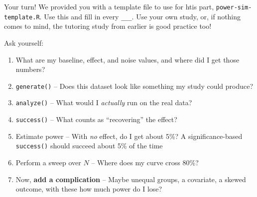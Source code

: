 \documentclass[
  ignorenonframetext,
  aspectratio=169,
]{beamer}
\providecommand{\tightlist}{%
  \setlength{\itemsep}{0pt}\setlength{\parskip}{0pt}}\usepackage{longtable,booktabs,array}
\begin{document}
\begin{frame}{Your turn!}
\label{your-turn}
We provided you with a template file to use for htis part,
\texttt{power-sim-template.R}. Use this and fill in every
\texttt{\_\_\_}. Use your own study, or, if nothing comes to mind, the
tutoring study from earlier is good practice too!

Ask yourself:

\begin{enumerate}
\tightlist
\item
  What are my baseline, effect, and noise values, and where did I get
  those numbers?
\item
  \texttt{generate()} -- Does this dataset look like something my study
  could produce?
\item
  \texttt{analyze()} -- What would I \textit{actually} run on the real
  data?
\item
  \texttt{success()} -- What counts as ``recovering'' the effect?
\item
  Estimate power -- With \textit{no} effect, do I get about 5\%? A
  significance-based \texttt{success()} should succeed about 5\% of the
  time
\item
  Perform a sweep over \(N\) -- Where does my curve cross 80\%?
\item
  Now, \textcolor{statsecondary}{\textbf{add a complication}} -- Maybe
  unequal groups, a covariate, a skewed outcome, with these how much
  power do I lose?
\end{enumerate}
\end{frame}
\end{document}
